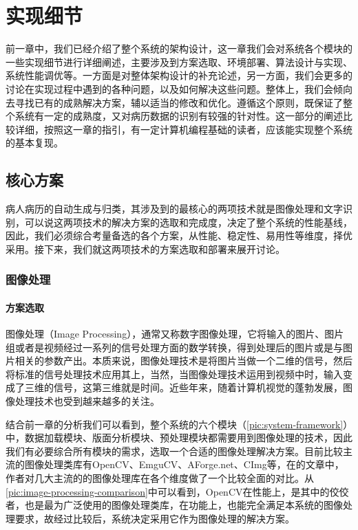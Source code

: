 \chapter{实现细节}
\label{chap:implements}
前一章中，我们已经介绍了整个系统的架构设计，这一章我们会对系统各个模块的一些实现细节进行详细阐述，主要涉及到方案选取、环境部署、算法设计与实现、系统性能调优等。一方面是对整体架构设计的补充论述，另一方面，我们会更多的讨论在实现过程中遇到的各种问题，以及如何解决这些问题。整体上，我们会倾向去寻找已有的成熟解决方案，辅以适当的修改和优化。遵循这个原则，既保证了整个系统有一定的成熟度，又对病历数据的识别有较强的针对性。这一部分的阐述比较详细，按照这一章的指引，有一定计算机编程基础的读者，应该能实现整个系统的基本复现。

\section{核心方案}
病人病历的自动生成与归类，其涉及到的最核心的两项技术就是图像处理和文字识别，可以说这两项技术的解决方案的选取和完成度，决定了整个系统的性能基线，因此，我们必须综合考量备选的各个方案，从性能、稳定性、易用性等维度，择优采用。接下来，我们就这两项技术的方案选取和部署来展开讨论。

\subsection{图像处理}
\subsubsection*{方案选取}
图像处理（Image Processing），通常又称数字图像处理，它将输入的图片、图片组或者是视频经过一系列的信号处理方面的数学转换，得到处理后的图片或是与图片相关的参数产出\citep{gonzalez2008digital}。本质来说，图像处理技术是将图片当做一个二维的信号，然后将标准的信号处理技术应用其上，当然，当图像处理技术运用到视频中时，输入变成了三维的信号，这第三维就是时间。近些年来，随着计算机视觉的蓬勃发展，图像处理技术也受到越来越多的关注。

结合前一章的分析我们可以看到，整个系统的六个模块（\autoref{pic:system-framework}）中，数据加载模块、版面分析模块、预处理模块都需要用到图像处理的技术，因此我们有必要综合所有模块的需求，选取一个合适的图像处理解决方案。目前比较主流的图像处理类库有OpenCV\citep{bradski2008OpenCV}、EmguCV\citep{Shi013emgu}、AForge.net\citep{Kirillov2013Aforge}、CImg\citep{tschumperle2012cimg}等，在\citep{XianrongWang}的文章中，作者对几大主流的的图像处理库在各个维度做了一个比较全面的对比。从\autoref{pic:image-processing-comparison}中可以看到，OpenCV在性能上，是其中的佼佼者，也是最为广泛使用的图像处理类库，在功能上，也能完全满足本系统的图像处理要求，故经过比较后，系统决定采用它作为图像处理的解决方案。


